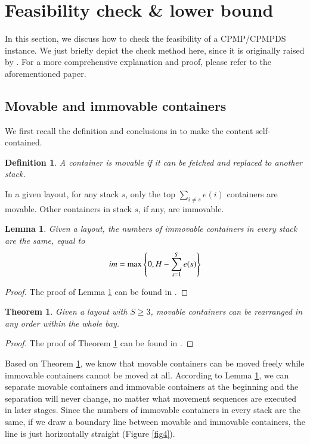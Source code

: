 \documentclass[review,3p,times,authoryear,12pt]{elsarticle}
\newtheorem{theorem}{Theorem}
\newtheorem{definition}{Definition}
\newtheorem{lemma}{Lemma}
\begin{document}
\section{Feasibility check \& lower bound}
\label{sec:cf}

In this section, we discuss how to check the feasibility of a CPMP/CPMPDS instance. We just briefly depict the check method here, since it is originally raised by \cite{Wang2013Check}. For a more comprehensive explanation and proof, please refer to the aforementioned paper.

\subsection{Movable and immovable containers}
We first recall the definition and conclusions in \cite{Wang2013Check} to make the content self-contained.

\begin{definition}
\label{def:1}
A container is movable if it can be fetched and replaced to another stack.
\end{definition}

In a given layout, for any stack $s$, only the top $\sum\limits_{i\neq s}e(i)$ containers are movable. Other containers in stack $s$, if any, are immovable.

\begin{lemma}
\label{lem:1}
Given a layout, the numbers of immovable containers in every stack are the same, equal to
\begin{equation}
\id{im}=\max\left\{0, H-\sum_{s=1}^S e(s)\right\}
\end{equation}
\end{lemma}
\begin{proof}
The proof of Lemma \ref{lem:1} can be found in \cite{Wang2013Check}.
\end{proof}

\begin{theorem}
\label{the:1}
Given a layout with $S\ge3$, movable containers can be rearranged in any order within the whole bay.
\end{theorem}
\begin{proof}
The proof of Theorem \ref{the:1} can be found in \cite{Wang2013Check}.
\end{proof}

Based on Theorem \ref{the:1}, we know that movable containers can be moved freely while immovable containers cannot be moved at all. According to Lemma \ref{lem:1}, we can separate movable containers and immovable containers at the beginning and the separation will never change, no matter what movement sequences are executed in later stages.
Since the numbers of immovable containers in every stack are the same, if we draw a boundary line between movable and immovable containers, the line is just horizontally straight (Figure \ref{fig4}).
\end{document}
